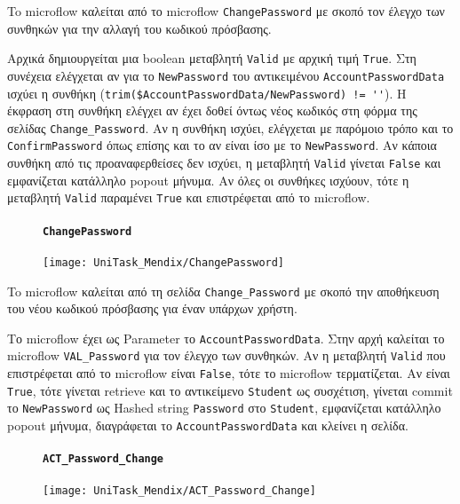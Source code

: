                     To microflow καλείται από το microflow \texttt{ChangePassword} με σκοπό τον έλεγχο των συνθηκών για την αλλαγή του κωδικού πρόσβασης.

                    Αρχικά δημιουργείται μια boolean μεταβλητή \texttt{Valid} με αρχική τιμή \texttt{True}. Στη συνέχεια ελέγχεται αν για το \texttt{NewPassword} του αντικειμένου \texttt{AccountPasswordData} ισχύει η συνθήκη (\verb|trim($AccountPasswordData/NewPassword) != ''|). Η έκφραση στη συνθήκη ελέγχει αν έχει δοθεί όντως νέος κωδικός στη φόρμα της σελίδας \texttt{Change\_Password}. Αν η συνθήκη ισχύει, ελέγχεται με παρόμοιο τρόπο και το \texttt{ConfirmPassword} όπως επίσης και το αν είναι ίσο με το \texttt{NewPassword}. Αν κάποια συνθήκη από τις προαναφερθείσες δεν ισχύει, η μεταβλητή \texttt{Valid} γίνεται \texttt{False} και εμφανίζεται κατάλληλο popout μήνυμα. Αν όλες οι συνθήκες ισχύουν, τότε η μεταβλητή \texttt{Valid} παραμένει \texttt{True} και επιστρέφεται από το microflow.

                \begin{figure}[H] \noindent
                    \paragraph{\texttt{ChangePassword}}
                    \begin{center}
                        \texttt{[image: UniTask\_Mendix/ChangePassword]}
                    \end{center}
                \end{figure}

                    To microflow καλείται από τη σελίδα \texttt{Change\_Password} με σκοπό την αποθήκευση του νέου κωδικού πρόσβασης για έναν υπάρχων χρήστη.

                    Το microflow έχει ως Parameter το \texttt{AccountPasswordData}. Στην αρχή καλείται το microflow \texttt{VAL\_Password} για τον έλεγχο των συνθηκών. Αν η μεταβλητή \texttt{Valid} που επιστρέφεται από το microflow είναι \texttt{False}, τότε το microflow τερματίζεται. Αν είναι \texttt{True}, τότε γίνεται retrieve και το αντικείμενο \texttt{Student} ως συσχέτιση, γίνεται commit το \texttt{NewPassword} ως Hashed string \texttt{Password} στο \texttt{Student}, εμφανίζεται κατάλληλο popout μήνυμα, διαγράφεται το \texttt{AccountPasswordData} και κλείνει η σελίδα.

                \begin{figure}[H] \noindent
                    \paragraph{\texttt{ACT\_Password\_Change}}
                    \begin{center}
                        \texttt{[image: UniTask\_Mendix/ACT\_Password\_Change]}
                    \end{center}
                \end{figure}

